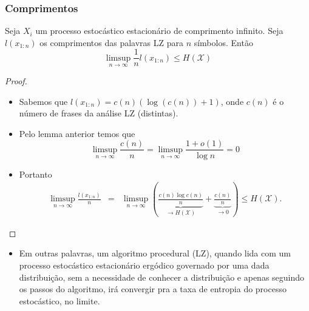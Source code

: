 \begin{frame}[allowframebreaks]
  \frametitle{Comprimentos}

  \begin{theorem}
  Seja $X_i$ um processo estocástico estacionário de comprimento infinito.
  Seja $l(x_{1:n})$ os comprimentos das palavras LZ para $n$ símbolos. Então
	\begin{equation}
	\limsup_{n \rightarrow \infty} \frac{1}{n} l(x_{1:n}) \leq H(\mathcal{X}) 
	\end{equation}
  \end{theorem} 

  \framebreak
  \begin{proof}
  \begin{itemize}
  \item Sabemos que $l(x_{1:n}) = c(n) ( \log(c(n)) + 1 )$, onde $c(n)$
	é o número de frases da análise LZ (distintas).
  \item Pelo lemma anterior temos que
	\begin{equation}
        \limsup_{n \rightarrow \infty} \frac{c(n)}{n} = \limsup_{n \rightarrow \infty} \frac{ 1 + o(1)}{\log n} = 0 
        \end{equation}

  \item Portanto
	\begin{eqnarray}
	\limsup_{n \rightarrow \infty} \frac{ l(x_{1:n}) }{n} &=& 
		\limsup_{n \rightarrow \infty} \left( \underbrace{\frac{c(n) \log c(n)}{n}}_{\rightarrow H(\mathcal{X})} + 
		\underbrace{\frac{c(n)}{n}}_{\rightarrow 0} \right) \leq H(\mathcal{X}) .
	\end{eqnarray}

  \end{itemize}
  \end{proof}

  \begin{itemize}
  \item Em outras palavras, um algoritmo procedural (LZ), quando lida com um processo
	estocástico estacionário ergódico governado por uma dada distribuição, 
	sem a necessidade de conhecer a distribuição e apenas seguindo os passos do
	algoritmo, irá convergir pra a taxa de entropia do processo estocástico, no limite.
  \end{itemize}
\end{frame}

